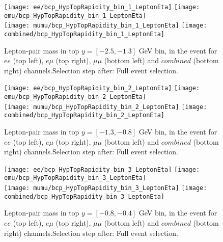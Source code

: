 \begin{figure}
  \texttt{[image: ee/bcp\_HypTopRapidity\_bin\_1\_LeptonEta]}
  \texttt{[image: emu/bcp\_HypTopRapidity\_bin\_1\_LeptonEta]}\\
  \texttt{[image: mumu/bcp\_HypTopRapidity\_bin\_1\_LeptonEta]}
  \texttt{[image: combined/bcp\_HypTopRapidity\_bin\_1\_LeptonEta]}
\caption{Lepton-pair mass in top $y = [-2.5,-1.3]$ GeV bin, in the event for $ee$ (top left), $e\mu$ (top right), $\mu\mu$ (bottom left) and $combined$ (bottom right) channels.\newline Selection step after: Full event selection.}
\end{figure}

\clearpage
\newpage


\begin{figure}
  \texttt{[image: ee/bcp\_HypTopRapidity\_bin\_2\_LeptonEta]}
  \texttt{[image: emu/bcp\_HypTopRapidity\_bin\_2\_LeptonEta]}\\
  \texttt{[image: mumu/bcp\_HypTopRapidity\_bin\_2\_LeptonEta]}
  \texttt{[image: combined/bcp\_HypTopRapidity\_bin\_2\_LeptonEta]}
\caption{Lepton-pair mass in top $y = [-1.3,-0.8]$ GeV bin, in the event for $ee$ (top left), $e\mu$ (top right), $\mu\mu$ (bottom left) and $combined$ (bottom right) channels.\newline Selection step after: Full event selection.}
\end{figure}

\clearpage
\newpage


\begin{figure}
  \texttt{[image: ee/bcp\_HypTopRapidity\_bin\_3\_LeptonEta]}
  \texttt{[image: emu/bcp\_HypTopRapidity\_bin\_3\_LeptonEta]}\\
  \texttt{[image: mumu/bcp\_HypTopRapidity\_bin\_3\_LeptonEta]}
  \texttt{[image: combined/bcp\_HypTopRapidity\_bin\_3\_LeptonEta]}
\caption{Lepton-pair mass in top $y = [-0.8,-0.4]$ GeV bin, in the event for $ee$ (top left), $e\mu$ (top right), $\mu\mu$ (bottom left) and $combined$ (bottom right) channels.\newline Selection step after: Full event selection.}
\end{figure}

\clearpage
\newpage

